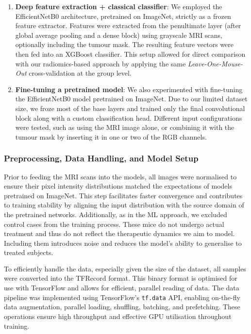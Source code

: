 \documentclass[12pt, a4paper]{report}
\begin{document}
\begin{enumerate}
    \item \textbf{Deep feature extraction + classical classifier}: We employed the EfficientNetB0 architecture, pretrained on ImageNet, strictly as a frozen feature extractor. Features were extracted from the penultimate layer (after global average pooling and a dense block) using grayscale MRI scans, optionally including the tumour mask. The resulting feature vectors were then fed into an XGBoost classifier. This setup allowed for direct comparison with our radiomics-based approach by applying the same \textit{Leave-One-Mouse-Out} cross-validation at the group level.

    \item \textbf{Fine-tuning a pretrained model}: We also experimented with fine-tuning the EfficientNetB0 model pretrained on ImageNet. Due to our limited dataset size, we froze most of the base layers and trained only the final convolutional block along with a custom classification head. Different input configurations were tested, such as using the MRI image alone, or combining it with the tumour mask by inserting it in one or two of the RGB channels.
\end{enumerate}

\subsubsection{Preprocessing, Data Handling, and Model Setup}

Prior to feeding the MRI scans into the models, all images were normalised to ensure their pixel intensity distributions matched the expectations of models pretrained on ImageNet. This step facilitates faster convergence and contributes to training stability by aligning the input distribution with the source domain of the pretrained networks. Additionally, as in the ML approach, we excluded control cases from the training process. These mice do not undergo actual treatment and thus do not reflect the therapeutic dynamics we aim to model. Including them introduces noise and reduces the model’s ability to generalise to treated subjects.

To efficiently handle the data, especially given the size of the dataset, all samples were converted into the TFRecord format. This binary format is optimised for use with TensorFlow and allows for efficient, parallel reading of data. The data pipeline was implemented using TensorFlow’s \texttt{tf.data} API, enabling on-the-fly data augmentation, parallel loading, shuffling, batching, and prefetching. These operations ensure high throughput and effective GPU utilisation throughout training.
\end{document}
